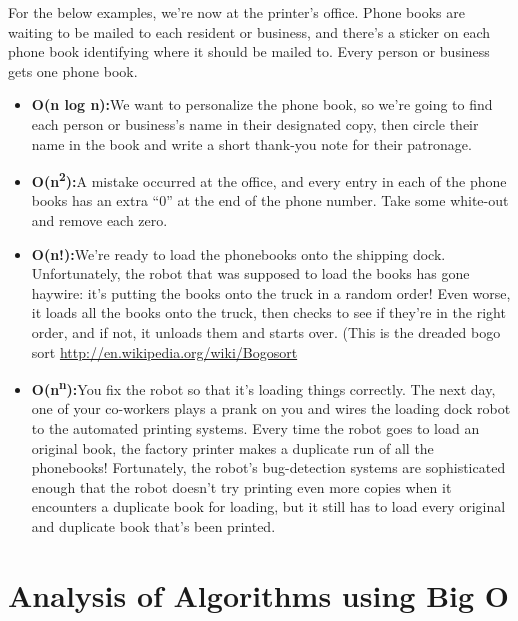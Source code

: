 \begin{displayquote}
{For the below examples, we're now at the printer's office. Phone books
are waiting to be mailed to each resident or business, and there's a
sticker on each phone book identifying where it should be mailed to.
Every person or business gets one phone book.}

\begin{itemize}

	\item \textbf{{O(n log n):}}{We want to personalize the phone book, so
we're going to find each person or business's name in their designated
copy, then circle their name in the book and write a short thank-you
note for their patronage.}

	\item \textbf{{O(n}\textsuperscript{{2}}{):}}{A mistake occurred at the
office, and every entry in each of the phone books has an extra ``0'' at
the end of the phone number. Take some white-out and remove each zero.}

	\item \textbf{{O(n!):}}{{}}{We're ready to load the phonebooks onto
the shipping dock. Unfortunately, the robot that was supposed to load
the books has gone haywire: it's putting the books onto the truck in a
random order! Even worse, it loads all the books onto the truck, then
checks to see if they're in the right order, and if not, it unloads them
and starts over. (This is the
dreaded bogo sort} \url{http://en.wikipedia.org/wiki/Bogosort}

	\item \textbf{{O(n}\textsuperscript{{n}}{):}}{{}}{You fix the robot so
that it's loading things correctly. The next day, one of your co-workers
plays a prank on you and wires the loading dock robot to the automated
printing systems. Every time the robot goes to load an original book,
the factory printer makes a duplicate run of all the phonebooks!
Fortunately, the robot's bug-detection systems are sophisticated enough
that the robot doesn't try printing even more copies when it encounters
a duplicate book for loading, but it still has to load every original
and duplicate book that's been printed.\\
}

\end{itemize}
\end{displayquote}



\section {Analysis of Algorithms using Big O}

